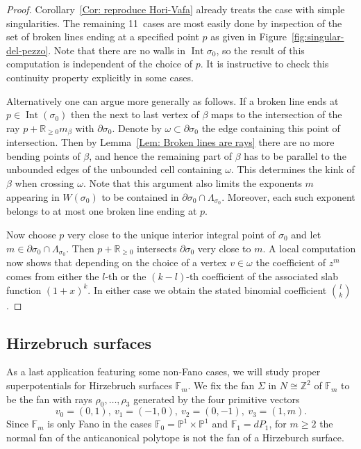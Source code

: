 \documentclass[11pt,letter]{amsart}
\theoremstyle{definition}
\theoremstyle{remark}
\numberwithin{equation}{section}
\numberwithin{figure}{section}
\newcommand{\ZZ} {\mathbb{Z}}
\newcommand{\RR} {\mathbb{R}}
\newcommand{\PP} {\mathbb{P}}
\newcommand {\Int}  {\operatorname{Int}}
\begin{document}
\begin{proof}
Corollary~\ref{Cor: reproduce Hori-Vafa} already treats the case with simple
singularities. The remaining 11~cases are most easily done by inspection of the
set of broken lines ending at a specified point $p$ as given in
Figure~\ref{fig:singular-del-pezzo}. Note that there are no walls in
$\Int\sigma_0$, so the result of this computation is independent of the choice
of $p$. It is instructive to check this continuity property explicitly in some
cases.

Alternatively one can argue more generally as follows. If a broken line ends at
$p\in\Int(\sigma_0)$ then the next to last vertex of $\beta$ maps to the
intersection of the ray $p+\RR_{\ge0} m_\beta$ with $\partial\sigma_0$. Denote by
$\omega\subset \partial\sigma_0$ the edge containing this point of intersection.
Then by Lemma~\ref{Lem: Broken lines are rays} there are no more bending points
of $\beta$, and hence the remaining part of $\beta$ has to be parallel to the
unbounded edges of the unbounded cell containing $\omega$. This determines the
kink of $\beta$ when crossing $\omega$. Note that this argument also limits the
exponents $m$ appearing in $W(\sigma_0)$ to be contained in
$\partial \sigma_0\cap\Lambda_{\sigma_0}$. Moreover, each such exponent belongs
to at most one broken line ending at $p$.

Now choose $p$ very close to the unique interior integral point of $\sigma_0$
and let $m\in \partial \sigma_0\cap\Lambda_{\sigma_0}$. Then $p+\RR_{\ge0}$
intersects $ \partial\sigma_0$ very close to $m$. A local computation now shows
that depending on the choice of a vertex $v\in\omega$ the coefficient of $z^m$
comes from either the $l$-th or the $(k-l)$-th coefficient of the associated
slab function $(1+x)^k$. In either case we obtain the stated binomial
coefficient $\binom{l}{k}$.
\end{proof}




\subsection{Hirzebruch surfaces}
As a last application featuring some non-Fano cases, we will study proper
superpotentials for Hirzebruch surfaces $\mathbb{F}_m$. We fix the fan $\Sigma$
in $N \cong \ZZ^2$ of $\mathbb{F}_m$ to be the fan with rays
$\rho_0,\ldots,\rho_3$ generated by the four primitive vectors
\[
v_0 = (0,1),\ v_1 = (-1,0),\ v_2 = (0,-1),\ v_3 = (1,m).
\]
Since $\mathbb{F}_m$ is only
Fano in the cases $\mathbb{F}_0 = \PP^1 \times \PP^1$ and $\mathbb{F}_1 = dP_1$,
for $m\geq2$ the normal fan of the anticanonical polytope is not the fan of a
Hirzeburch surface.
\end{document}
